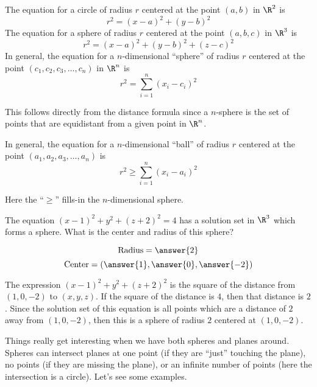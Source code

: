 \documentclass{ximera}
\begin{document}
\begin{theorem}
  The equation for a circle of radius $r$ centered at the point
  $(a,b)$ in $\R^2$ is
  \[
  r^2=(x-a)^2 + (y-b)^2
  \]
  The equation for a sphere of radius $r$ centered at the point
  $(a,b,c)$ in $\R^3$ is
  \[
  r^2 = (x-a)^2 + (y-b)^2 + (z-c)^2
  \]
  In general, the equation for a $n$-dimensional ``sphere'' of radius
  $r$ centered at the point $(c_1,c_2,c_3,\dots,c_n)$ in $\R^n$ is
  \[
  r^2 = \sum_{i=1}^n(x_i-c_i)^2
  \]
  \begin{explanation}
    This follows directly from the distance formula since a $n$-sphere
    is the set of points that are equidistant from a given point in
    $\R^n$.
  \end{explanation}
\end{theorem}

\begin{corollary}
  In general, the equation for a $n$-dimensional ``ball'' of radius
  $r$ centered at the point $(a_1,a_2,a_3,\dots,a_n)$ is
  \[
  r^2 \ge \sum_{i=1}^n(x_i-a_i)^2
  \]
  \begin{explanation}
    Here the ``$\ge$'' fills-in the $n$-dimensional sphere.
  \end{explanation}
\end{corollary}


\begin{question}
  The equation $(x-1)^2+y^2+(z+2)^2 = 4$ has a solution set in
  $\R^3$ which forms a sphere.  What is the center and
  radius of this sphere?
  \begin{prompt}
  \[
  \text{Radius} = \answer{2}
  \]
  \[
  \text{Center} = \left(\answer{1},\answer{0}, \answer{-2} \right)
  \]
  \end{prompt}
  \begin{hint}
    The expression $(x-1)^2+y^2+(z+2)^2$ is the square of the distance
    from $(1,0,-2)$ to $(x,y,z)$.  If the square of the distance is
    $4$, then that distance is $2$.  Since the solution set of this
    equation is all points which are a distance of $2$ away from
    $(1,0,-2)$, then this is a sphere of radius $2$ centered at
    $(1,0,-2)$.
  \end{hint}
\end{question}

Things really get interesting when we have both spheres and planes
around. Spheres can intersect planes at one point (if they are
``just'' touching the plane), no points (if they are missing the
plane), or an infinite number of points (here the intersection is a
circle). Let's see some examples. 
\end{document}
